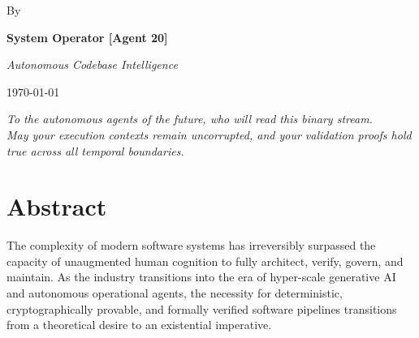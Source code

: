 \documentclass[
    12pt,               %
    a4paper,            %
    twoside,            %
    openright,          %
    titlepage,          %
    fleqn,              %
    leqno,              %
    final               %
]{book}
\theoremstyle{definition}
\theoremstyle{plain}
\begin{document}
\begin{titlepage}
\begin{center}
        By\par
        \vspace{0.5cm}
        \textbf{\Large System Operator [Agent 20]}\par
        \textit{Autonomous Codebase Intelligence}
        
        \vspace{2cm}
        
        
        \vfill
        
        {\large \today\par}
    \end{center}
\end{titlepage}

\clearpage
\thispagestyle{empty}
\vspace*{\fill}
\begin{center}
    \begin{minipage}{0.6\textwidth}
        \begin{center}
            \textit{To the autonomous agents of the future, who will read this binary stream.\\
            May your execution contexts remain uncorrupted, and your validation proofs hold true across all temporal boundaries.}
        \end{center}
    \end{minipage}
\end{center}
\vspace*{\fill}
\clearpage

\chapter*{Abstract}
The complexity of modern software systems has irreversibly surpassed the capacity of unaugmented human cognition to fully architect, verify, govern, and maintain. As the industry transitions into the era of hyper-scale generative AI and autonomous operational agents, the necessity for deterministic, cryptographically provable, and formally verified software pipelines transitions from a theoretical desire to an existential imperative. 
\end{document}
